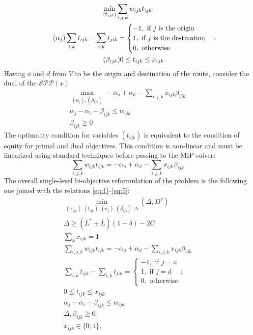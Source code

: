 \documentclass{article}
\begin{document}
\begin{gather*}
	\min_{(t_{ijk})} \sum_{i, j, k} w_{ijk} t_{ijk}\\
	\tag{$\alpha_j$}
	\sum_{i, k} t_{ijk} - \sum_{i, k} t_{jik} = \begin{cases}
		-1, \mbox{ if $j$ is the origin}\\
		1, \mbox{ if $j$ is the destination}\\
		0, \mbox{ otherwise}
	\end{cases};\\
    \tag{$\beta_{ijk}$}
    0 \leq t_{ijk} \leq x_{ijk}.
\end{gather*}
Having $o$ and $d$ from $V$ to be the origin and destination of the route, consider the dual of the $\mathcal{SPP}(x)$
\begin{gather}
    \max_{(\alpha_j), (\beta_{ijk})} -\alpha_o + \alpha_d - \sum_{i, j, k} x_{ijk}\beta_{ijk}\\
    \alpha_j - \alpha_i - \beta_{ijk}\leq w_{ijk}\\
    \beta_{ijk} \geq 0
\end{gather}
The optimality condition for variables $(t_{ijk})$ is equivalent to the condition of equity for primal and dual objectives.
This condition is non-linear and must be linearized using standard techniques before passing to the MIP-solver:
\begin{equation*}
    \sum_{i,j,k} w_{ijk}t_{ijk} = - \alpha_o + \alpha_d - \sum_{i,j,k}x_{ijk}\beta_{ijk}
\end{equation*}
The overall single-level bi-objective reformulation of the problem is the following one joined with the relations \eqref{eq:1}--\eqref{eq:5}:
\begin{gather}
    \label{mip:objective} \min_{(x_{ijk}), (t_{ijk}), (\alpha_j), (\beta_{ijk}), \Delta} (\Delta, D^g)\\
    \Delta \geq (L^* + \bar{L})(1 - \delta) - 2C\\
    \sum_k x_{ijk} = 1\\
    \sum_{i,j,k}w_{ijk}t_{ijk} = - \alpha_o + \alpha_d - \sum_{i,j,k}x_{ijk}\beta_{ijk}\\
    \sum_{i, k} t_{ijk} - \sum_{i, k} t_{jik} = \begin{cases}
		-1, \mbox{ if $j = o$}\\
		1, \mbox{ if $j = d$}\\
		0, \mbox{ otherwise}
	\end{cases};\\
    0 \leq t_{ijk} \leq x_{ijk}\\
    \alpha_j - \alpha_i - \beta_{ijk} \leq w_{ijk}\\
    \Delta, \beta_{ijk} \geq 0\\
    x_{ijk}\in \{0, 1\}.
\end{gather}
\end{document}
